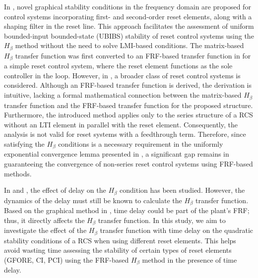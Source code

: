 In \cite{dastjerdi2023frequency}, novel graphical stability conditions in the frequency domain are proposed for control systems incorporating first- and second-order reset elements, along with a shaping filter in the reset line. This approach facilitates the assessment of uniform bounded-input bounded-state (UBIBS) stability of reset control systems using the $H_\beta$ method without the need to solve LMI-based conditions. The matrix-based $H_\beta$ transfer function was first converted to an FRF-based transfer function in \cite[Corollary 3.12]{beker2001analysis} for a simple reset control system, where the reset element functions as the sole controller in the loop. However, in \cite{dastjerdi2023frequency}, a broader class of reset control systems is considered. Although an FRF-based transfer function is derived, the derivation is intuitive, lacking a formal mathematical connection between the matrix-based $H_\beta$ transfer function and the FRF-based transfer function for the proposed structure. Furthermore, the introduced method applies only to the series structure of a RCS without an LTI element in parallel with the reset element. Consequently, the analysis is not valid for reset systems with a feedthrough term. Therefore, since satisfying the $H_\beta$ conditions is a necessary requirement in the uniformly exponential convergence lemma presented in \cite{dastjerdi2022closed}, a significant gap remains in guaranteeing the convergence of non-series reset control systems using FRF-based methods.   

In \cite{banos2010reset} and \cite{guo2015analysis}, the effect of delay on the $H_\beta$ condition has been studied. However, the dynamics of the delay must still be known to calculate the $H_\beta$ transfer function. Based on the graphical method in \cite{dastjerdi2023frequency}, time delay could be part of the plant's FRF; thus, it directly affects the $H_\beta$ transfer function. In this study, we aim to investigate the effect of the $H_\beta$ transfer function with time delay on the quadratic stability conditions of a RCS when using different reset elements. This helps avoid wasting time assessing the stability of certain types of reset elements (GFORE, CI, PCI) using the FRF-based $H_\beta$ method in the presence of time delay.\\

